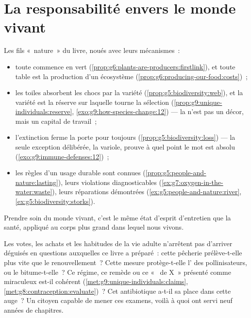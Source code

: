 \section{La responsabilité envers le monde vivant}

\begin{proposition}\label{prop:g9:our-responsibility:stewardship}
Les fils «~nature~» du livre, noués avec leurs mécanismes~:
\begin{itemize}
  \item toute  commence en vert
        (\cref{prop:g6:plants-are-producers:firstlink}), et
        toute table est la production d'un écosystème
        (\cref{prop:g6:producing-our-food:costs})~;
  \item les toiles absorbent les chocs par la variété
        (\cref{prop:g5:biodiversity:web}), et la variété est
        la réserve sur laquelle tourne la sélection
        (\cref{prop:g9:unique-individuals:reserve},
        \cref{exo:g9:how-species-change:12}) --- la
         n'est pas un décor, mais un capital de
        travail~;
  \item l'extinction ferme la porte pour toujours
        (\cref{prop:g5:biodiversity:loss}) --- la seule
        exception délibérée, la variole, prouve à quel point
        le mot est absolu
        (\cref{exo:g9:immune-defenses:12})~;
  \item les règles d'un usage durable sont connues
        (\cref{prop:g5:people-and-nature:lasting}), leurs
        violations diagnosticables
        (\cref{ex:g7:oxygen-in-the-water:waste}), leurs
        réparations démontrées
        (\cref{ex:g5:people-and-nature:river},
        \cref{ex:g5:biodiversity:storks}).
\end{itemize}
Prendre soin du monde vivant, c'est le même état d'esprit
d'entretien que la santé, appliqué au corps plus grand dans
lequel nous vivons.
\end{proposition}
\admitted

\begin{example}\label{ex:g9:our-responsibility:citizen}
Les votes, les achats et les habitudes de la vie adulte
n'arrêtent pas d'arriver déguisés en questions auxquelles ce
livre a préparé~: cette pêcherie prélève-t-elle plus vite
que le renouvellement~? Cette mesure protège-t-elle
l' des pollinisateurs, ou le bitume-t-elle~? Ce
régime, ce remède ou ce «~ de X~» présenté comme
miraculeux est-il cohérent
(\cref{met:g9:unique-individuals:claims},
\cref{met:g8:contraception:evaluate})~? Cet antibiotique
a-t-il sa place dans cette auge~? Un citoyen capable de
mener ces examens, voilà à quoi ont servi neuf années de
chapitres.
\end{example}

